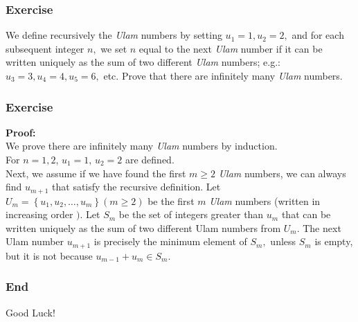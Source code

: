 \documentclass[10pt, t]{beamer}
\newcommand{\nullspace}{~\\[15pt]}
\begin{document}
\begin{frame}
    \frametitle{Exercise}

    We define recursively the \textit{Ulam} numbers by setting $u_{1}=1, u_{2}=2,$ and for each subsequent integer $n,$ we set $n$ equal to the next \textit{Ulam} number if it can be written uniquely as the sum of two different \textit{Ulam} numbers; e.g.: $u_{3}=3, u_{4}=4, u_{5}=6,$ etc. Prove that there are infinitely many \textit{Ulam} numbers.

\end{frame}

\begin{frame}
    \frametitle{Exercise}

    \textbf{Proof: } \nullspace
    We prove there are infinitely many \textit{Ulam} numbers by induction.\nullspace
    For $n=1,2$, $u_1=1,\, u_2=2$ are defined. \nullspace
    Next, we assume if we have found the first $m\geq 2$ \textit{Ulam} numbers, we can always find $u_{m+1}$ that satisfy the recursive definition. Let $U_{m}=\left\{u_{1}, u_{2}, \ldots, u_{m}\right\}(m \geq 2)$ be the first $m$ \textit{Ulam} numbers (written in increasing order $) .$ Let $S_{m}$ be the set of integers greater than $u_{m}$ that can be written uniquely as the sum of two different Ulam numbers from $U_{m} .$ The next Ulam number $u_{m+1}$ is precisely the minimum element of $S_{m},$ unless $S_{m}$ is empty, but it is not because $u_{m-1}+u_{m} \in S_{m}$.

\end{frame}

\begin{frame}
    \frametitle{End}
    \vspace{2.2cm}
    \begin{center}
        \Large
        Good Luck!
    \end{center}
\end{frame}
\end{document}
